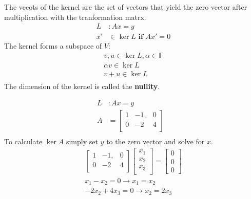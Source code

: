 The vecots of the kernel are the set of vectors that yield the zero vector after multiplication with the tranformation matrx.
\begin{align*}
    L  & : Ax = y                          \\
    x' & \in \ker L  \textbf{ if } Ax' = 0
\end{align*}
The kernel forms a subspace of \( V \):
\begin{align*}
    v, u \in \ker L, \alpha \in \mathbb{F} \\
    \alpha v \in \ker L                    \\
    v + u \in \ker L                       \\
\end{align*}
The dimension of the kernel is called the \textbf{nullity}.
\begin{example}
    \begin{align*}
        L & : Ax = y                        \\
        A & =  \begin{bmatrix}
            1 & -1, & 0 \\
            0 & -2  & 4 \\
        \end{bmatrix} & \\
    \end{align*}
    To calculate \( \ker A\) simply set \(y\) to the zero vector and solve for \(x\).
    \begin{align*}
        \begin{bmatrix}
            1 & -1, & 0 \\
            0 & -2  & 4 \\
        \end{bmatrix} \begin{bmatrix}
            x_1 \\
            x_2 \\
            x_3 \\
        \end{bmatrix} = \begin{bmatrix}
            0 \\ 0 \\ 0
        \end{bmatrix} \\
        x_1 - x_2       = 0 \rightarrow x_1 = x_2                                          \\
        -2 x_2 + 4 x_3  = 0 \rightarrow x_2 = 2 x_3                                        \\

\end{align*}
\end{example}
